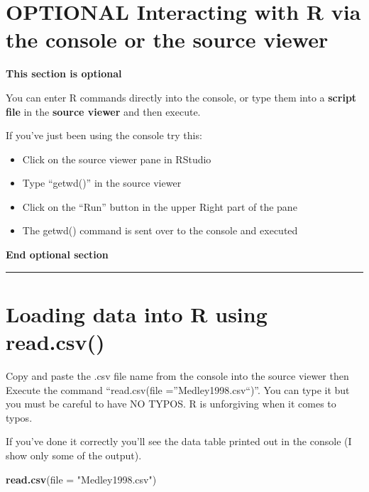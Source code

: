 \documentclass[]{book}
\newenvironment{Shaded}{\begin{snugshade}}{\end{snugshade}}
\newcommand{\KeywordTok}[1]{\textcolor[rgb]{0.13,0.29,0.53}{\textbf{#1}}}
\newcommand{\DataTypeTok}[1]{\textcolor[rgb]{0.13,0.29,0.53}{#1}}
\newcommand{\StringTok}[1]{\textcolor[rgb]{0.31,0.60,0.02}{#1}}
\newcommand{\NormalTok}[1]{#1}
\providecommand{\tightlist}{%
  \setlength{\itemsep}{0pt}\setlength{\parskip}{0pt}}
\theoremstyle{definition}
\theoremstyle{definition}
\theoremstyle{definition}
\theoremstyle{remark}
\begin{document}
\section{OPTIONAL Interacting with R via the console or the source
viewer}\label{optional-interacting-with-r-via-the-console-or-the-source-viewer}

\textbf{This section is optional}

You can enter R commands directly into the console, or type them into a
\textbf{script file} in the \textbf{source viewer} and then execute.

If you've just been using the console try this:

\begin{itemize}
\tightlist
\item
  Click on the source viewer pane in RStudio
\item
  Type ``getwd()'' in the source viewer
\item
  Click on the ``Run'' button in the upper Right part of the pane
\item
  The getwd() command is sent over to the console and executed
\end{itemize}

\textbf{End optional section}

\begin{center}\rule{0.5\linewidth}{\linethickness}\end{center}

\section{Loading data into R using
read.csv()}\label{loading-data-into-r-using-read.csv}

Copy and paste the .csv file name from the console into the source
viewer then Execute the command ``read.csv(file =''Medley1998.csv``)''.
You can type it but you must be careful to have NO TYPOS. R is
unforgiving when it comes to typos.

If you've done it correctly you'll see the data table printed out in the
console (I show only some of the output).

\begin{Shaded}
\begin{Highlighting}[]
\KeywordTok{read.csv}\NormalTok{(}\DataTypeTok{file =} \StringTok{"Medley1998.csv"}\NormalTok{)}
\end{Highlighting}
\end{Shaded}
\end{document}

